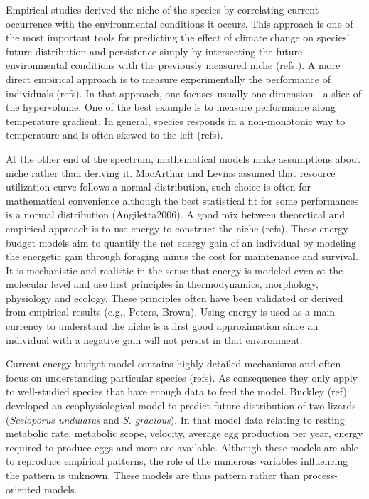 Empirical studies derived the niche of the species by correlating current occurrence with the environmental conditions it occurs. 
This approach is one of the most important tools for predicting the effect of climate change on species' future distribution and persistence simply by intersecting the future environmental conditions with the previously measured niche (refs.).
A more direct empirical approach is to measure experimentally the performance of individuals (refs).
In that approach, one focuses usually one dimension---a slice of the hypervolume.
One of the best example is to measure performance along temperature gradient. 
In general, species responds in a non-monotonic way to temperature and is often skewed to the left (refs).

At the other end of the spectrum, mathematical models make assumptions about niche rather than deriving it. 
MacArthur and Levins assumed that resource utilization curve follows a normal distribution, such choice is often for mathematical convenience although the best statistical fit for some performances is a normal distribution (Angiletta2006). 
A good mix between theoretical and empirical approach is to use energy to construct the niche (refs).
These energy budget models aim to quantify the net energy gain of an individual by modeling the energetic gain through foraging minus the cost for maintenance and survival.
It is mechanistic and realistic in the sense that energy is modeled even at the molecular level and use first principles in thermodynamics, morphology, physiology and ecology.
These principles often have been validated or derived from empirical results (e.g., Peters, Brown).
Using energy is used as a main currency to understand the niche is a first good approximation since an individual with a negative gain will not persist in that environment.


Current energy budget model contains highly detailed mechanisms and often focus on understanding particular species (refs).
As consequence they only apply to well-studied species that have enough data to feed the model.
Buckley (ref) developed an ecophysiological model to predict future distribution of two lizards (\textit{Sceloporus undulatus} and \textit{S. gracious}).
In that model data relating to resting metabolic rate, metabolic scope, velocity, average egg production per year, energy required to produce eggs and more are available.
Although these models are able to reproduce empirical patterns, the role of the numerous variables influencing the pattern is unknown.
These models are thus pattern rather than process-oriented models.

